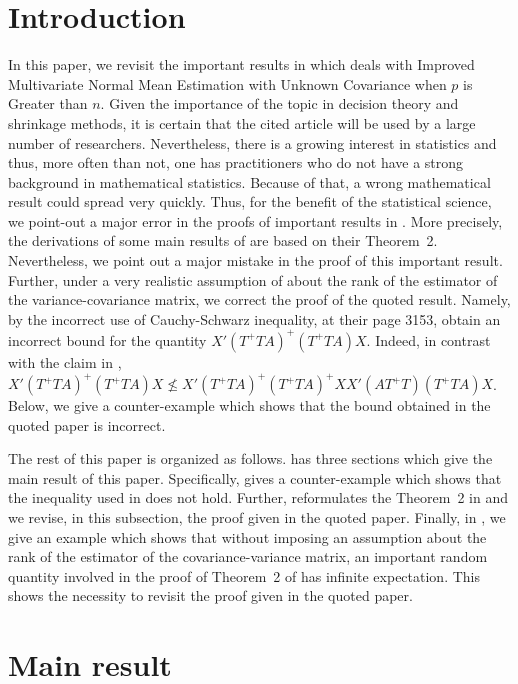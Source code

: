 \documentclass[aos]{imsart}
\numberwithin{equation}{section}
\begin{document}
\section{Introduction}\label{sec:intro}
In this paper, we revisit the important results in \cite{ChetelatWells} which deals with Improved Multivariate Normal Mean Estimation with
Unknown Covariance when $p$ is Greater than $n$. Given the importance of the topic in decision theory and shrinkage methods, it is certain that the cited article will be used by a large number of researchers. Nevertheless, there is a growing interest in  statistics and thus, more often than not, one has practitioners who do not have a strong background in mathematical statistics. Because of that, a wrong mathematical result could spread very quickly.   Thus, for the benefit of the statistical science, we point-out a major error in the proofs of important results in \cite{ChetelatWells}.
More precisely, the derivations of some main results of \cite{ChetelatWells} are based on their Theorem~2. Nevertheless,  we point out a major mistake in the proof of this important result. Further, under a very realistic assumption of  about the rank of the estimator of the variance-covariance matrix, we correct the proof of the quoted result. Namely, by the incorrect use of Cauchy-Schwarz inequality, at their page 3153, \cite{ChetelatWells} obtain an incorrect bound for the quantity $X'(T^{+}TA)^{+}(T^{+}TA)X$. Indeed, in contrast with the claim in \cite{ChetelatWells},
$X'(T^{+}TA)^{+}(T^{+}TA)X\nleqslant X'(T^{+}TA)^{+}(T^{+}TA)^{+}XX'(AT^{+}T)(T^{+}TA)X$.
 Below, we give a counter-example which shows that the bound obtained in the quoted paper is incorrect.

The rest of this paper is organized as follows.  has three sections which give the main result of this paper. Specifically,  gives a counter-example which shows that the inequality used in \cite{ChetelatWells} does not hold. Further,  reformulates the Theorem~2 in \cite{ChetelatWells} and we revise, in this subsection, the proof given in the quoted paper. Finally, in , we give an example which shows that without imposing an assumption about the rank of the estimator of the covariance-variance matrix, an important random quantity involved in the proof of Theorem~2 of \cite{ChetelatWells} has infinite expectation. This shows the necessity to revisit the proof given in the quoted paper.
\section{Main result}\label{sec:mainresult}
\end{document}
